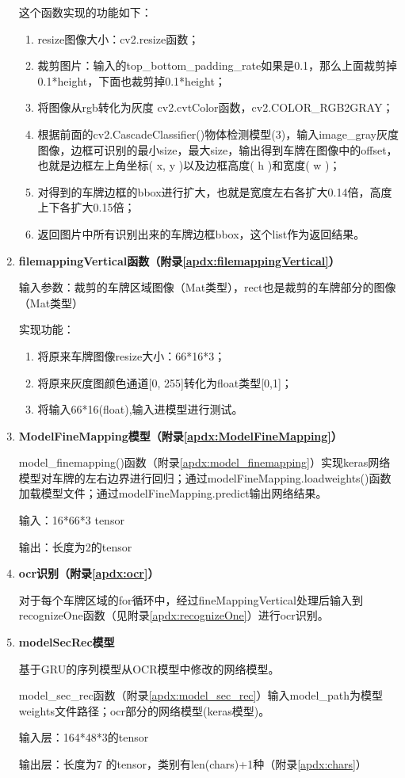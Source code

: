 \begin{enumerate}[label=\arabic*、]
	      这个函数实现的功能如下：
	      \begin{enumerate}
		      \item resize图像大小：cv2.resize函数；
		      \item 裁剪图片：输入的top\_bottom\_padding\_rate如果是0.1，那么上面裁剪掉0.1*height，下面也裁剪掉0.1*height；
		      \item 将图像从rgb转化为灰度 cv2.cvtColor函数，cv2.COLOR\_RGB2GRAY；
		      \item 根据前面的cv2.CascadeClassifier()物体检测模型(3)，输入image\_gray灰度图像，边框可识别的最小size，最大size，输出得到车牌在图像中的offset，也就是边框左上角坐标( x, y )以及边框高度( h )和宽度( w )；
		      \item 对得到的车牌边框的bbox进行扩大，也就是宽度左右各扩大0.14倍，高度上下各扩大0.15倍；
		      \item 返回图片中所有识别出来的车牌边框bbox，这个list作为返回结果。
	      \end{enumerate}


	\item {\bf filemappingVertical函数（附录\ref{apdx:filemappingVertical}）}
	
	      输入参数：裁剪的车牌区域图像（Mat类型），rect也是裁剪的车牌部分的图像（Mat类型）

	      实现功能：
	      \begin{enumerate}
		      \item 将原来车牌图像resize大小：66*16*3；
		      \item 将原来灰度图颜色通道[0, 255]转化为float类型[0,1]；
		      \item 将输入66*16(float),输入进模型进行测试。
	      \end{enumerate}

	\item {\bf ModelFineMapping模型（附录\ref{apdx:ModelFineMapping}）}
	
	      model\_finemapping()函数（附录\ref{apdx:model_finemapping}）实现keras网络模型对车牌的左右边界进行回归；通过modelFineMapping.loadweights()函数加载模型文件；通过modelFineMapping.predict输出网络结果。

	      输入：16*66*3 tensor

	      输出：长度为2的tensor

	\item {\bf ocr识别（附录\ref{apdx:ocr}）}
	
	      对于每个车牌区域的for循环中，经过fineMappingVertical处理后输入到recognizeOne函数（见附录\ref{apdx:recognizeOne}）进行ocr识别。

	\item {\bf modelSecRec模型}
	
		  基于GRU的序列模型从OCR模型中修改的网络模型。
		  
		  model\_sec\_rec函数（附录\ref{apdx:model_sec_rec}）输入model\_path为模型weights文件路径；ocr部分的网络模型(keras模型)。
		  
		  输入层：164*48*3的tensor
		  
	      输出层：长度为7 的tensor，类别有len(chars)+1种（附录\ref{apdx:chars}）

\end{enumerate}
